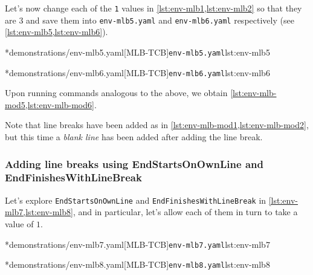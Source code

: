 	Let's%
		now change each
	of the \texttt{1} values in \cref{lst:env-mlb1,lst:env-mlb2} so that they are
	$3$ and save them into \texttt{env-mlb5.yaml} and
	\texttt{env-mlb6.yaml} respectively (see \cref{lst:env-mlb5,lst:env-mlb6}).

	\begin{minipage}{.45\textwidth}
		\cmhlistingsfromfile[style=yaml-LST]*{demonstrations/env-mlb5.yaml}[MLB-TCB]{\texttt{env-mlb5.yaml}}{lst:env-mlb5}
	\end{minipage}
	\hfill
	\begin{minipage}{.45\textwidth}
		\cmhlistingsfromfile[style=yaml-LST]*{demonstrations/env-mlb6.yaml}[MLB-TCB]{\texttt{env-mlb6.yaml}}{lst:env-mlb6}
	\end{minipage}

	Upon running  commands analogous to the above, we obtain \cref{lst:env-mlb-mod5,lst:env-mlb-mod6}.

	\begin{widepage}
		\begin{minipage}{.56\linewidth}
		\end{minipage}
		\hfill
		\begin{minipage}{.43\linewidth}
		\end{minipage}
	\end{widepage}

	Note that line breaks have been added as in \cref{lst:env-mlb-mod1,lst:env-mlb-mod2}, but this time a
	\emph{blank line} has been added after adding the line break.

\subsubsection{Adding line breaks using EndStartsOnOwnLine and EndFinishesWithLineBreak}
	Let's explore \texttt{EndStartsOnOwnLine} and \texttt{EndFinishesWithLineBreak} in
	\cref{lst:env-mlb7,lst:env-mlb8}, and in particular, let's allow each of them in turn to take
	a value of $1$.

	\begin{minipage}{.49\textwidth}
		\cmhlistingsfromfile[style=yaml-LST]*{demonstrations/env-mlb7.yaml}[MLB-TCB]{\texttt{env-mlb7.yaml}}{lst:env-mlb7}
	\end{minipage}
	\hfill
	\begin{minipage}{.49\textwidth}
		\cmhlistingsfromfile[style=yaml-LST]*{demonstrations/env-mlb8.yaml}[MLB-TCB]{\texttt{env-mlb8.yaml}}{lst:env-mlb8}
	\end{minipage}

